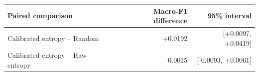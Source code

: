 \begin{tabular}{lrr}
\toprule
Paired comparison & Macro-F1 difference & 95\% interval \\
\midrule
Calibrated entropy -- Random & +0.0192 & [+0.0097, +0.0419] \\
Calibrated entropy -- Raw entropy & -0.0015 & [-0.0093, +0.0061] \\
\bottomrule
\end{tabular}
